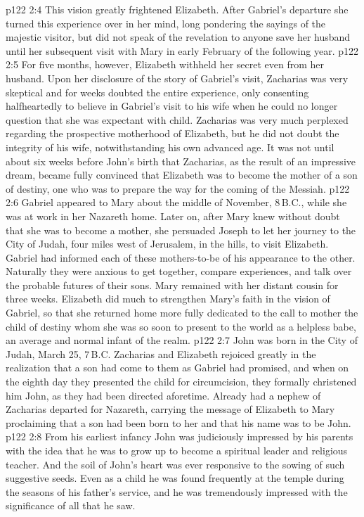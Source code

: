 \vs p122 2:4 This vision greatly frightened Elizabeth. After Gabriel’s departure she turned this experience over in her mind, long pondering the sayings of the majestic visitor, but did not speak of the revelation to anyone save her husband until her subsequent visit with Mary in early February of the following year.
\vs p122 2:5 \pc For five months, however, Elizabeth withheld her secret even from her husband. Upon her disclosure of the story of Gabriel’s visit, Zacharias was very skeptical and for weeks doubted the entire experience, only consenting halfheartedly to believe in Gabriel’s visit to his wife when he could no longer question that she was expectant with child. Zacharias was very much perplexed regarding the prospective motherhood of Elizabeth, but he did not doubt the integrity of his wife, notwithstanding his own advanced age. It was not until about six weeks before John’s birth that Zacharias, as the result of an impressive dream, became fully convinced that Elizabeth was to become the mother of a son of destiny, one who was to prepare the way for the coming of the Messiah.
\vs p122 2:6 Gabriel appeared to Mary about the middle of November, 8\,B.C., while she was at work in her Nazareth home. Later on, after Mary knew without doubt that she was to become a mother, she persuaded Joseph to let her journey to the City of Judah, four miles west of Jerusalem, in the hills, to visit Elizabeth. Gabriel had informed each of these mothers\hyp{}to\hyp{}be of his appearance to the other. Naturally they were anxious to get together, compare experiences, and talk over the probable futures of their sons. Mary remained with her distant cousin for three weeks. Elizabeth did much to strengthen Mary’s faith in the vision of Gabriel, so that she returned home more fully dedicated to the call to mother the child of destiny whom she was so soon to present to the world as a helpless babe, an average and normal infant of the realm.
\vs p122 2:7 \pc John was born in the City of Judah, March 25, 7\,B.C. Zacharias and Elizabeth rejoiced greatly in the realization that a son had come to them as Gabriel had promised, and when on the eighth day they presented the child for circumcision, they formally christened him John, as they had been directed aforetime. Already had a nephew of Zacharias departed for Nazareth, carrying the message of Elizabeth to Mary proclaiming that a son had been born to her and that his name was to be John.
\vs p122 2:8 From his earliest infancy John was judiciously impressed by his parents with the idea that he was to grow up to become a spiritual leader and religious teacher. And the soil of John’s heart was ever responsive to the sowing of such suggestive seeds. Even as a child he was found frequently at the temple during the seasons of his father’s service, and he was tremendously impressed with the significance of all that he saw.
